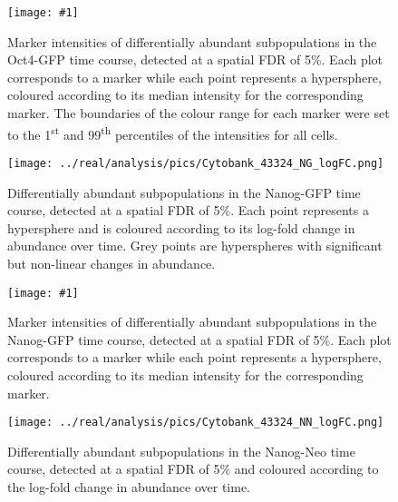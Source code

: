 \documentclass{article}
\begin{document}
\newcommand{\bigfigopt}[1]{\texttt{[image: \#1]}}

\begin{figure}[p]
    \begin{center}
    \bigfigopt{../real/analysis/pics/Cytobank_43324_4FI_markers.png}
    \end{center}
    \caption{
        Marker intensities of differentially abundant subpopulations in the Oct4-GFP time course, detected at a spatial FDR of 5\%.
        Each plot corresponds to a marker while each point represents a hypersphere, coloured according to its median intensity for the corresponding marker.
        The boundaries of the colour range for each marker were set to the 1\textsuperscript{st} and 99\textsuperscript{th} percentiles of the intensities for all cells.
    }
    \label{fig:oct4_markers}
\end{figure}

\begin{figure}[p]
    \begin{center}
    \texttt{[image: ../real/analysis/pics/Cytobank\_43324\_NG\_logFC.png]}
    \end{center}
    \caption{
        Differentially abundant subpopulations in the Nanog-GFP time course, detected at a spatial FDR of 5\%.
        Each point represents a hypersphere and is coloured according to its log-fold change in abundance over time.
        Grey points are hyperspheres with significant but non-linear changes in abundance.
    }
\end{figure}

\begin{figure}[p]
    \begin{center}
    \bigfigopt{../real/analysis/pics/Cytobank_43324_NG_markers.png}
    \end{center}
    \caption{
        Marker intensities of differentially abundant subpopulations in the Nanog-GFP time course, detected at a spatial FDR of 5\%.
        Each plot corresponds to a marker while each point represents a hypersphere, coloured according to its median intensity for the corresponding marker.
    }
\end{figure}

\begin{figure}[p]
    \begin{center}
    \texttt{[image: ../real/analysis/pics/Cytobank\_43324\_NN\_logFC.png]}
    \end{center}
    \caption{
        Differentially abundant subpopulations in the Nanog-Neo time course, detected at a spatial FDR of 5\% and coloured according to the log-fold change in abundance over time.
    }
\end{figure}
\end{document}
